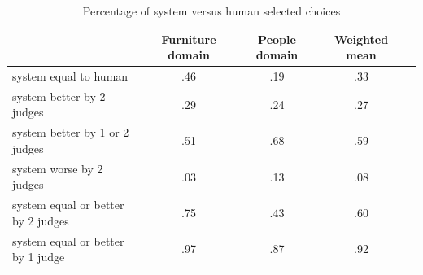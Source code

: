 \begin{table}[h!]
\begin{center}
\begin{tabular}{|l|c|c|c|c|}
\hline
 & Furniture domain & People domain & Weighted mean \\
\hline
system equal to human  	&	.46	&	.19	&	.33 \\
system better by 2 judges &	.29 	& 	.24 	& 	.27 \\
system better by 1 or 2 judges & .51	&	.68	&	.59 \\
system worse by 2 judges &	.03	&	.13	&	.08 \\
system equal or better by 2 judges  &.75  &       .43	&       .60 \\
system equal or better by 1 judge  &.97	&	.87	&	.92 \\
\hline
\end{tabular}
\caption{Percentage of system versus human selected choices} 
\label{system-versus-human}
\vspace*{-.5cm}
\end{center}
\end{table}




